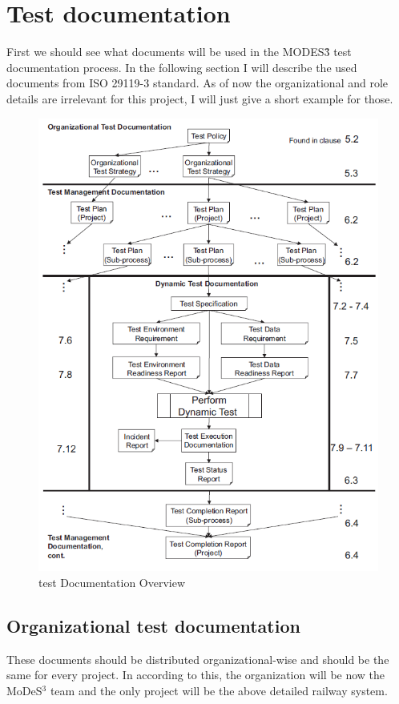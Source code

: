 \section{Test documentation}
First we should see what documents will be used in the MODES\^3 test documentation process. In the following section I will describe the used documents from ISO 29119-3 standard. As of now the organizational and role details are irrelevant for this project, I will just give a short example for those.
\begin{figure}[!h]
	\centering
	\includegraphics[width=150mm, keepaspectratio]{figures/testDesign/TestDoc.png}
	\caption{test Documentation Overview}
	\label{fig:TestDocOverview}
\end{figure}

\subsection{Organizational test documentation}
These documents should be distributed organizational-wise and should be the same for every project. In according to this, the organization will be now the MoDeS$^3$ team and the only project will be the above detailed railway system.

